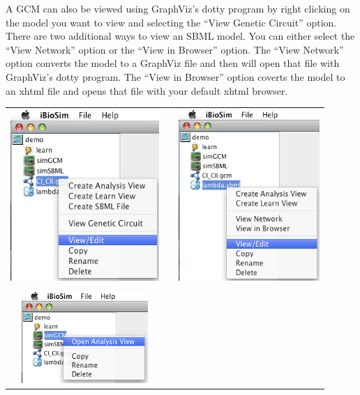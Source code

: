 \documentclass[titlepage,11pt]{article}
\begin{document}
\noindent
A GCM can also be viewed using 
GraphViz's
dotty program  by right clicking on the model you want to view and
selecting the ``View Genetic Circuit'' option. 
There are two additional ways to view an SBML model. You
can either select the ``View Network'' option or the
``View in Browser'' option.  The ``View Network''
option converts the model to a GraphViz file and then will open that 
file with GraphViz's dotty program.  The ``View in Browser'' option 
coverts the model to an xhtml file and opens that file with your 
default xhtml browser.

\begin{center}
\begin{tabular}{ccc}
\includegraphics[height=65mm]{screenshots/modGCM} & &
\includegraphics[height=65mm]{screenshots/modSBML} \\ \\
\includegraphics[height=35mm]{screenshots/modAnalysis} & &

\end{tabular}
\end{center}
\end{document}
